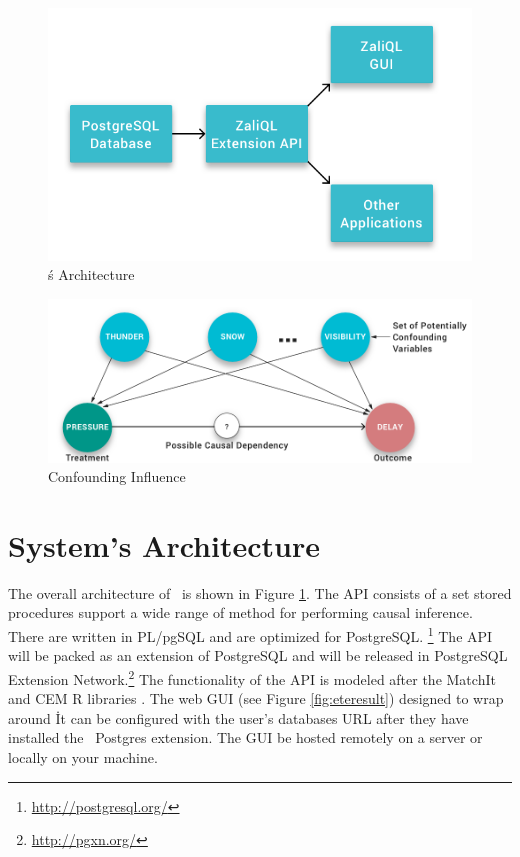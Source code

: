 
\begin{figure}
 \includegraphics[scale=0.25]{Figures/System-Overview.png}
 \caption{\GSQLB\'s Architecture}
  \label{fig:arch}
  \vspace{-3mm}
\end{figure}

\begin{figure}
\hspace*{.3cm}\includegraphics[scale=0.2]{figures/Scenario-Graph.png}
\caption{Confounding Influence}

\label{fig:cv}
\vspace{-0.3cm}
\end{figure}

\section{System's Architecture}

The overall architecture of \GSQL\ is shown in Figure \ref{fig:arch}.
The API consists of a set stored procedures support a wide range of method for performing causal inference.  There are written in PL/pgSQL and are optimized for PostgreSQL. \footnote{\url{http://postgresql.org/}}
The API will be packed  as an extension of  PostgreSQL and will be released in 
PostgreSQL Extension Network.\footnote{\url{http://pgxn.org/}}
The functionality of the API is modeled after the MatchIt and CEM R libraries \cite{ho2005,iacus2009cem}. The web GUI (see Figure \ref{fig:eteresult}) designed to wrap around \GSQL\. It can be configured with the user's databases URL after they have installed the \GSQL\ Postgres extension. The  GUI be hosted remotely on a server or locally on your machine. 
